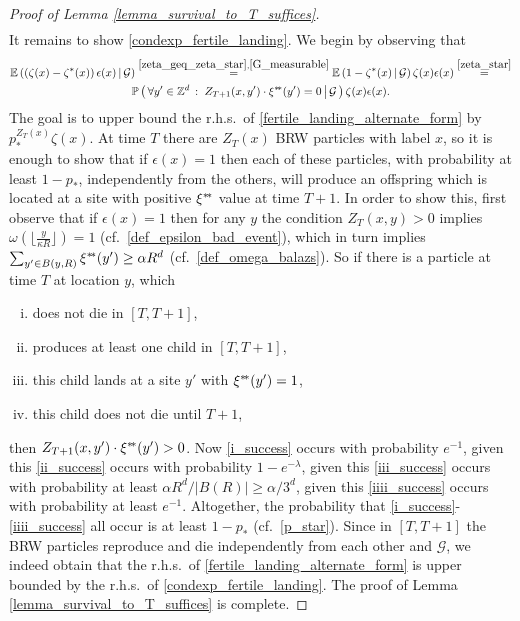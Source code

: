 \documentclass[a4paper,12pt]{article}
\newcommand{\sstar}{* \hspace{-.05cm} *}
\begin{document}
\begin{proof}[Proof of Lemma \ref{lemma_survival_to_T_suffices}]
\begin{multline}
\end{multline}
It remains to show \eqref{condexp_fertile_landing}. We begin by observing that
\begin{multline}\label{fertile_landing_alternate_form}
 \mathbb{E}\left( \left(\zeta(x) - \zeta^{*}(x) \right)\epsilon(x) \,   | \,  \mathcal{G} \right) \stackrel{\eqref{zeta_geq_zeta_star}, \eqref{G_measurable} }{=}
 \mathbb{E}\left( 1 - \zeta^{*}(x) \,   | \,  \mathcal{G} \right) \zeta(x) \epsilon(x)\stackrel{ \eqref{zeta_star} }{=} \\
   \mathbb{P}\left(\, \forall y' \in \mathbb{Z}^d \, : \;  Z_{T+1}(x,y') \cdot  \xi^{\sstar}(y')=0
       \, \big| \,  \mathcal{G}\, \right) \zeta(x) \epsilon(x).
\end{multline}
The goal is to upper bound the r.h.s.\ of \eqref{fertile_landing_alternate_form} by  $p_*^{Z_T(x)} \zeta(x)$. At time $T$ there are $Z_T(x)$ BRW particles with label $x$, so it is enough to show that if $\epsilon(x)=1$ then each of these particles, with probability at least $1-p_*$, independently from the others, will produce an offspring which is located at a site
 with positive $\xi^{\sstar}$ value at time $T+1$. In order to show this, first
observe that if $\epsilon(x)=1$ then for any $y$ the condition $Z_T(x,y)>0$ implies $\omega\left( \lfloor \frac{y}{\kappa R} \rfloor \right)=1$ (cf.\ \eqref{def_epsilon_bad_event}), which in turn implies
  $\sum_{y' \in B(y,R)} \xi^{\sstar}(y') \geq \alpha R^d$ (cf.\  \eqref{def_omega_balazs}). So if there is a particle at time $T$ at location $y$, which
  \begin{enumerate}[(i)]
  \item \label{i_success} does not die in $[T,T+1]$,
  \item \label{ii_success} produces at least one child in $[T,T+1]$,
  \item \label{iii_success} this child lands at a site $y'$ with $\xi^{\sstar}(y')=1$,
  \item \label{iiii_success} this child does not die until $T+1$,
\end{enumerate}
then $Z_{T+1}(x,y') \cdot  \xi^{\sstar}(y')>0$. Now \eqref{i_success} occurs with probability $e^{-1}$, given this \eqref{ii_success} occurs
with probability $1-e^{-\lambda}$, given this \eqref{iii_success} occurs with probability at least $\alpha R^d /|B(R)| \geq \alpha / 3^d$, given this
\eqref{iiii_success} occurs with probability at least $e^{-1}$. Altogether, the probability that \eqref{i_success}-\eqref{iiii_success} all occur is at least $1-p_*$ (cf.\
\eqref{p_star}). Since in $[T,T+1]$ the BRW particles reproduce and die independently from each other and  $\mathcal{G}$, we indeed obtain that the r.h.s.\ of
\eqref{fertile_landing_alternate_form} is upper bounded by the r.h.s.\ of \eqref{condexp_fertile_landing}. The proof
of Lemma \ref{lemma_survival_to_T_suffices} is complete.
\end{proof}
\end{document}
